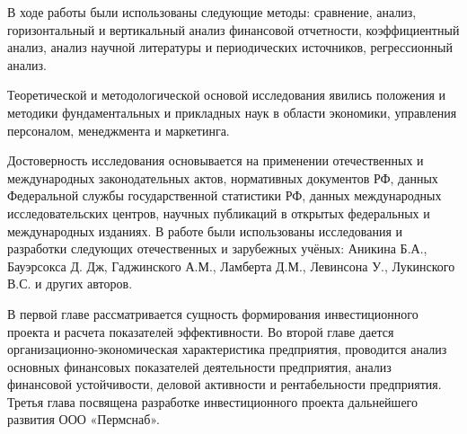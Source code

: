 В ходе работы были использованы следующие методы: сравнение, анализ, горизонтальный и вертикальный анализ финансовой отчетности, коэффициентный анализ, анализ научной литературы и периодических источников, регрессионный анализ.

Теоретической и методологической основой исследования явились положения и методики фундаментальных и прикладных наук в области экономики, управления персоналом, менеджмента и маркетинга.

Достоверность исследования основывается на применении отечественных и международных законодательных актов, нормативных документов РФ, данных Федеральной службы государственной статистики РФ, данных международных исследовательских центров, научных публикаций в открытых федеральных и международных изданиях. В работе были использованы исследования и разработки следующих отечественных и зарубежных учёных: Аникина Б.А., Бауэрсокса Д. Дж, Гаджинского А.М., Ламберта Д.М., Левинсона У., Лукинского В.С. и других авторов.


В первой главе рассматривается сущность формирования инвестиционного проекта и расчета показателей эффективности. Во второй главе дается организационно-экономическая характеристика предприятия, проводится анализ основных финансовых показателей деятельности предприятия, анализ финансовой устойчивости, деловой активности и рентабельности предприятия. Третья глава посвящена разработке инвестиционного проекта дальнейшего развития ООО «Пермснаб».
